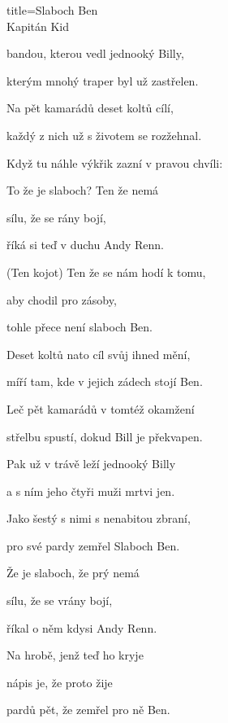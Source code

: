 \begin{song}{title=\centering Slaboch Ben \\\normalsize Kapitán Kid  \vspace*{-0.3cm}}
{	bandou, kterou vedl jednooký Billy,
	
	kterým mnohý traper byl už zastřelen.
	
	Na pět kamarádů deset koltů cílí,
	
	každý z nich už s životem se rozžehnal.

	Když tu náhle výkřik zazní v pravou chvíli:
	
	
	To že je slaboch? Ten že nemá
	
	sílu, že se rány bojí,
	
	říká si teď v duchu Andy Renn.
	
	(Ten kojot) Ten že se nám hodí k tomu,
	
	aby chodil pro zásoby,
	
	tohle přece není slaboch Ben.

\sloka
	Deset koltů nato cíl svůj ihned mění,
	
	míří tam, kde v jejich zádech stojí Ben.

	Leč pět kamarádů v tomtéž okamžení
	
	střelbu spustí, dokud Bill je překvapen.
	
	Pak už v trávě leží jednooký Billy
	
	a s ním jeho čtyři muži mrtvi jen.
	
	Jako šestý s nimi s nenabitou zbraní,
	
	pro své pardy zemřel Slaboch Ben.

	Že je slaboch, že prý nemá
	
	sílu, že se vrány bojí,
	
	říkal o něm kdysi Andy Renn.
	
	Na hrobě, jenž teď ho kryje
	
	nápis je, že proto žije
	
	pardů pět, že zemřel pro ně Ben.

}
\setcounter{Slokočet}{0}
\end{song}

